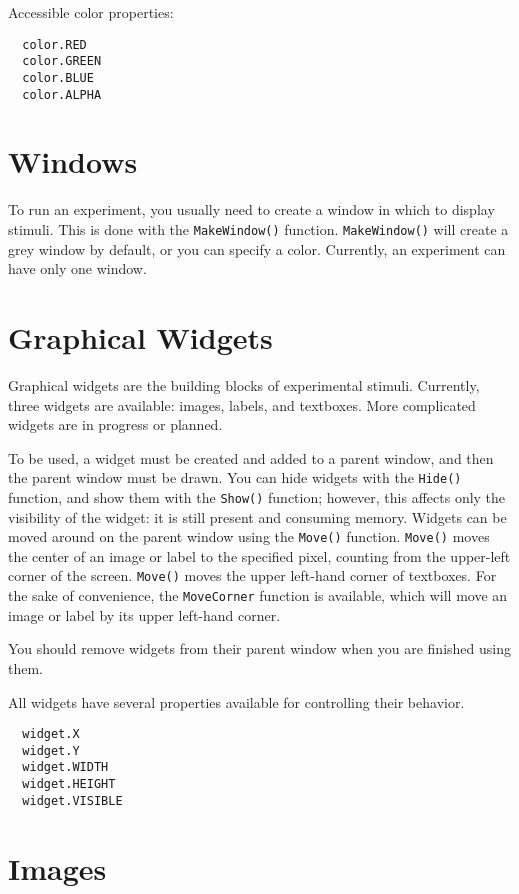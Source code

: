 Accessible color properties:
\begin{verbatim}
  color.RED
  color.GREEN
  color.BLUE
  color.ALPHA
\end{verbatim}
 

\section{Windows}

To run an experiment, you usually need to create a window in which 
to display stimuli.  This is done with the \texttt{MakeWindow()} function. \texttt{MakeWindow()} will create a grey window by default, or you can 
specify a color.  Currently, an experiment can have only one window.


\section{Graphical Widgets}

Graphical widgets are the building blocks of experimental stimuli. 
Currently, three widgets are available: images, labels, and textboxes.  
More complicated widgets are in progress or planned.

To be used, a widget must be created and added to a parent window, and
then the parent window must be drawn.  You can hide widgets with the
\texttt{Hide()} function, and show them with the \texttt{Show()}
function; however, this affects only the visibility of the widget: it
is still present and consuming memory. Widgets can be moved around on
the parent window using the \texttt{Move()} function. \texttt{Move()}
moves the center of an image or label to the specified pixel, counting
from the upper-left corner of the screen. \texttt{Move()} moves the
upper left-hand corner of textboxes.  For the sake of convenience, the
\texttt{MoveCorner} function is available, which will move an image or
label by its upper left-hand corner.

You should remove widgets from their parent window when you are
finished using them.

All widgets have several properties available for controlling their
behavior.
\begin{verbatim}
  widget.X
  widget.Y
  widget.WIDTH
  widget.HEIGHT
  widget.VISIBLE
\end{verbatim}

  


\section{Images}

